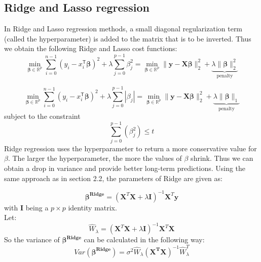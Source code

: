 \documentclass{emulateapj}
\begin{document}
\subsection{Ridge and Lasso regression}
In Ridge and Lasso regression methods, a  small diagonal regularization term (called the hyperparameter) is added to the matrix that is to be inverted. Thus we obtain the following Ridge and Lasso cost functions:
\begin{equation}
\min_{\boldsymbol{\beta} \in \mathbb{R}^p} \sum_{i=0}^{n-1}(y_i - x_i^\mathsf{T}\boldsymbol{\beta} )^2 + \lambda\sum_{j=0}^{p-1}\beta_j^2 = \min_{\boldsymbol{\beta} \in \mathbb{R}^p}  \| \mathbf{y} - \mathbf{X}\boldsymbol{\beta} \|^2_2 + \underbrace{\lambda\| \boldsymbol{\beta}\|^2_2}_{\mathrm{penalty}}
\end{equation}

\begin{equation}
\min_{\boldsymbol{\beta} \in \mathbb{R}^p}\sum\limits_{i=0}^{n-1}(y_i - x_i^\mathsf{T}\boldsymbol{\beta} )^2+\lambda\sum\limits_{j=0}^{p-1}\left|\beta_j\right|=\min_{\boldsymbol{\beta} \in \mathbb{R}^p} \| \mathbf{y} - \mathbf{X}\boldsymbol{\beta} \|^2_2 +\underbrace{ \lambda\| \boldsymbol{\beta}\|_1}_{\mathrm{penalty}}
\end{equation}
subject to the constraint
\begin{equation}
  \sum\limits_{j=0}^{p-1}(\beta_j^2)\leq t 
\end{equation}
Ridge regression uses the hyperparameter to return a more conservative value for $\beta$. The larger the hyperparameter, the more the values of $\beta$ shrink. Thus we can obtain a drop in variance and provide better long-term predictions. Using the same approach as in section 2.2, the parameters of Ridge are given as:

\begin{equation}
\boldsymbol{\beta^{Ridge}}=(\mathbf{X}^T \mathbf{X}+\lambda\mathbf{I})^{-1} \mathbf{X}^T\mathbf{y}
\end{equation}
with $\mathbf{I}$ being a $p\times p$ identity matrix.\\
Let:
\begin{equation}
\hat{W}_\lambda=(\mathbf{X}^T \mathbf{X}+\lambda\mathbf{I})^{-1} \mathbf{X}^T\mathbf{X}
\end{equation}
So the variance of $\boldsymbol{\beta^{Ridge}}$ can be calculated in the following way:
\begin{equation}
Var(\boldsymbol{\beta^{Ridge}})=\sigma^2\hat{W}_\lambda(\mathbf{X^TX})^{-1}\hat{W}_\lambda^T
\end{equation}
\end{document}
